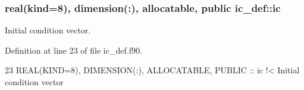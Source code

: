\subsubsection[{\texorpdfstring{ic}{ic}}]{\setlength{\rightskip}{0pt plus 5cm}real(kind=8), dimension(\+:), allocatable, public ic\+\_\+def\+::ic}\hypertarget{namespaceic__def_abef3b68b2ee81311ed2c796cba3a382f}{}\label{namespaceic__def_abef3b68b2ee81311ed2c796cba3a382f}


Initial condition vector. 



Definition at line 23 of file ic\+\_\+def.\+f90.


\begin{DoxyCode}
23   \textcolor{keywordtype}{REAL(KIND=8)}, \textcolor{keywordtype}{DIMENSION(:)}, \textcolor{keywordtype}{ALLOCATABLE}, \textcolor{keywordtype}{PUBLIC} :: ic\textcolor{comment}{ !< Initial condition vector}
\end{DoxyCode}
